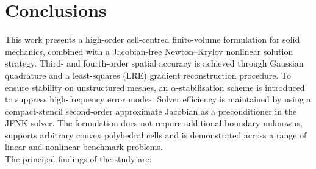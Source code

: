 \documentclass[review,3p]{elsarticle}
\begin{document}
\section{Conclusions} \label{sec:conclusion}
This work presents a high-order cell-centred finite-volume formulation for solid mechanics, combined with a Jacobian-free Newton–Krylov nonlinear solution strategy. 
Third- and fourth-order spatial accuracy is achieved through Gaussian quadrature and a least-squares (LRE) gradient reconstruction procedure.
To ensure stability on unstructured meshes, an $\alpha$-stabilisation scheme is introduced to suppress high-frequency error modes. 
Solver efficiency is maintained by using a compact-stencil second-order approximate Jacobian as a preconditioner in the JFNK solver.
The formulation does not require additional boundary unknowns, supports arbitrary convex polyhedral cells and is demonstrated across a range of linear and nonlinear benchmark problems.
\\
The principal findings of the study are:
%
\end{document}
